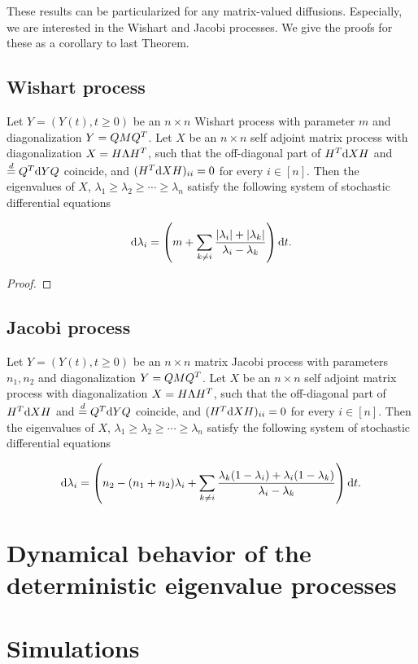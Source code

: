 These results can be particularized for any matrix-valued diffusions. Especially, we are interested in the Wishart and Jacobi processes. We give the proofs for these as a corollary to last Theorem.

\subsection{Wishart process}

\begin{corollary}
    Let $Y = (Y(t), t \ge 0)$ be an $n\times n$ Wishart process with parameter $m$ and diagonalization $Y = QMQ^T$. Let $X$ be an $n\times n$ self adjoint matrix process with diagonalization $X = H \Lambda H^T$, such that the off-diagonal part of $H^T \mathrm d X H $ and $\overset{d}{=} Q^T \mathrm d Y Q$ coincide, and $(H^T \mathrm d X H)_{ii} = 0$ for every $i \in [n]$. Then the eigenvalues of $X$, $\lambda_1 \ge \lambda_2 \ge \cdots \ge \lambda_n$ satisfy the following system of stochastic differential equations

    \begin{equation*}
        \mathrm d \lambda_i = \left( m +\sum_{k\neq i} \frac{ \lvert \lambda_i \rvert + \lvert \lambda_k \rvert }{\lambda_i - \lambda_k}\right)\mathrm d t.
    \end{equation*}
\end{corollary}

\begin{proof}
    
\end{proof}


\subsection{Jacobi process}

\begin{corollary}
    Let $Y = (Y(t), t \ge 0)$ be an $n\times n$ matrix Jacobi process with parameters $n_1,n_2$ and diagonalization $Y = QMQ^T$. Let $X$ be an $n\times n$ self adjoint matrix process with diagonalization $X = H \Lambda H^T$, such that the off-diagonal part of $H^T \mathrm d X H $ and $\overset{d}{=} Q^T \mathrm d Y Q$ coincide, and $(H^T \mathrm d X H)_{ii} = 0$ for every $i \in [n]$. Then the eigenvalues of $X$, $\lambda_1 \ge \lambda_2 \ge \cdots \ge \lambda_n$ satisfy the following system of stochastic differential equations

    \begin{equation*}
        \mathrm d \lambda_i = \left( n_2 - (n_1 + n_2)\lambda_i + \sum_{k\neq i} \frac{\lambda_k(1-\lambda_i) + \lambda_i(1-\lambda_k)}{\lambda_i - \lambda_k} \right)\mathrm d t.
    \end{equation*}

\end{corollary}

\section{Dynamical behavior of the deterministic eigenvalue processes}

\section{Simulations}